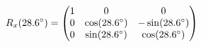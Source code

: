 \documentclass[preview]{standalone}
\begin{document}
\begin{align*}
\special{dvisvgm:raw <g id='unique000'>}R_x(28.6^\circ) = \begin{pmatrix} 1 & 0 & 0 \\ 0 & \cos(28.6^\circ) & -\sin(28.6^\circ) \\ 0 & \sin(28.6^\circ) & \cos(28.6^\circ) \end{pmatrix}\special{dvisvgm:raw </g>}
\end{align*}
\end{document}
